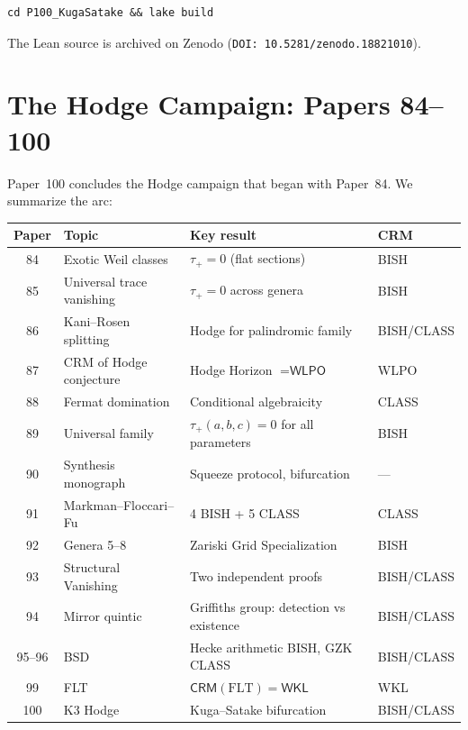 \documentclass[11pt,a4paper]{article}
\theoremstyle{plain}
\theoremstyle{definition}
\newcommand{\WKL}{\textsf{WKL}}
\newcommand{\WLPO}{\textsf{WLPO}}
\newcommand{\CRM}{\textsf{CRM}}
\begin{document}
\begin{verbatim}
cd P100_KugaSatake && lake build
\end{verbatim}

\noindent The Lean source is archived on Zenodo (\texttt{DOI: 10.5281/zenodo.18821010}).

\section{The Hodge Campaign: Papers 84--100}\label{sec:campaign}

Paper~100 concludes the Hodge campaign that began with Paper~84. We summarize the arc:

\begin{center}
\begin{tabular}{clll}
\toprule
\textbf{Paper} & \textbf{Topic} & \textbf{Key result} & \textbf{CRM} \\
\midrule
84 & Exotic Weil classes & $\tau_+ = 0$ (flat sections) & BISH \\
85 & Universal trace vanishing & $\tau_+ = 0$ across genera & BISH \\
86 & Kani--Rosen splitting & Hodge for palindromic family & BISH/CLASS \\
87 & CRM of Hodge conjecture & Hodge Horizon $= \WLPO$ & WLPO \\
88 & Fermat domination & Conditional algebraicity & CLASS \\
89 & Universal family & $\tau_+(a,b,c) = 0$ for all parameters & BISH \\
90 & Synthesis monograph & Squeeze protocol, bifurcation & --- \\
91 & Markman--Floccari--Fu & 4 BISH + 5 CLASS & CLASS \\
92 & Genera 5--8 & Zariski Grid Specialization & BISH \\
93 & Structural Vanishing & Two independent proofs & BISH/CLASS \\
94 & Mirror quintic & Griffiths group: detection vs existence & BISH/CLASS \\
95--96 & BSD & Hecke arithmetic BISH, GZK CLASS & BISH/CLASS \\
99 & FLT & $\CRM(\mathrm{FLT}) = \WKL$ & WKL \\
100 & K3 Hodge & Kuga--Satake bifurcation & BISH/CLASS \\
\bottomrule
\end{tabular}
\end{center}
\end{document}
